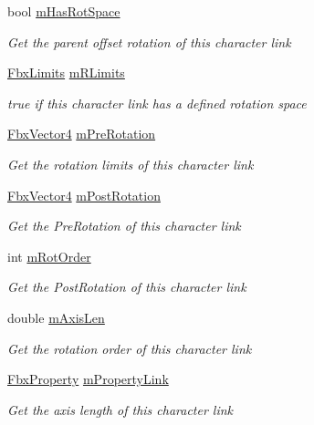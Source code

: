 \begin{DoxyCompactItemize}
bool \hyperlink{class_fbx_character_link_a013df32c72b266e1b0c23ed6e88d6723}{m\+Has\+Rot\+Space}
\begin{DoxyCompactList}\small\item\em Get the parent offset rotation of this character link \end{DoxyCompactList}\item 
\hyperlink{class_fbx_limits}{Fbx\+Limits} \hyperlink{class_fbx_character_link_a54890e0bba0ad7aa9e345a5a907258d9}{m\+R\+Limits}
\begin{DoxyCompactList}\small\item\em {\ttfamily true} if this character link has a defined rotation space \end{DoxyCompactList}\item 
\hyperlink{class_fbx_vector4}{Fbx\+Vector4} \hyperlink{class_fbx_character_link_ad72d5286a98d4e83b71bb2c53885d6ce}{m\+Pre\+Rotation}
\begin{DoxyCompactList}\small\item\em Get the rotation limits of this character link \end{DoxyCompactList}\item 
\hyperlink{class_fbx_vector4}{Fbx\+Vector4} \hyperlink{class_fbx_character_link_a35c2a40e3cbf60ed88c23487c3c57526}{m\+Post\+Rotation}
\begin{DoxyCompactList}\small\item\em Get the Pre\+Rotation of this character link \end{DoxyCompactList}\item 
int \hyperlink{class_fbx_character_link_ae55332d252f95e91e842117a566f53d7}{m\+Rot\+Order}
\begin{DoxyCompactList}\small\item\em Get the Post\+Rotation of this character link \end{DoxyCompactList}\item 
double \hyperlink{class_fbx_character_link_a9d523e0ad398dcbab03548d725ed7d4e}{m\+Axis\+Len}
\begin{DoxyCompactList}\small\item\em Get the rotation order of this character link \end{DoxyCompactList}\item 
\hyperlink{class_fbx_property}{Fbx\+Property} \hyperlink{class_fbx_character_link_aa0e1f2f48f9da2baca38191023b55e10}{m\+Property\+Link}
\begin{DoxyCompactList}\small\item\em Get the axis length of this character link \end{DoxyCompactList}\item 

\end{DoxyCompactItemize}
